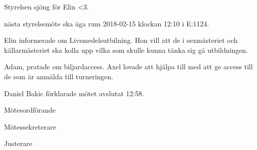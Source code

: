 \documentclass[10pt]{article}
\def\mo{Daniel Bakic}
\def\ms{Axel Voss}
\def\ji{Elin Johansson}
\begin{document}
\begin{paragrafer}

  Styrelsen sjöng för Elin <3.

\Mba nästa styrelsemöte ska äga rum 2018-02-15 klockan 12:10 i E:1124.


\Ibfu


  Elin informerade om Livsmedelsutbilning. Hon vill att de i sexmästeriet och källarmästeriet ska kolla upp vilka som skulle kunna tänka sig gå utbildningen.

  Adam, pratade om biljardaccess. Axel lovade att hjälpa till med att ge access till de som är anmälda till turneringen.

{\mo} förklarade mötet avslutat 12:58.
\end{paragrafer}

\hidesignfoot
\begin{signatures}{3}
\signature{\mo}{Mötesordförande}
\signature{\ms}{Mötessekreterare}
\signature{\ji}{Justerare}
\end{signatures}
\end{document}
